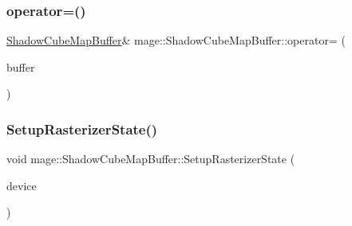 \hypertarget{structmage_1_1_shadow_cube_map_buffer_aebf8e9d2e0a2ec5bf13dc40b93f97fde}{}\label{structmage_1_1_shadow_cube_map_buffer_aebf8e9d2e0a2ec5bf13dc40b93f97fde} 
\subsubsection{\texorpdfstring{operator=()}{operator=()}\hspace{0.1cm}{\footnotesize\ttfamily [2/2]}}
{\footnotesize\ttfamily \hyperlink{structmage_1_1_shadow_cube_map_buffer}{Shadow\+Cube\+Map\+Buffer}\& mage\+::\+Shadow\+Cube\+Map\+Buffer\+::operator= (\begin{DoxyParamCaption}\item[{\hyperlink{structmage_1_1_shadow_cube_map_buffer}{Shadow\+Cube\+Map\+Buffer} \&\&}]{buffer }\end{DoxyParamCaption})\hspace{0.3cm}{\ttfamily [delete]}}

\hypertarget{structmage_1_1_shadow_cube_map_buffer_a2bee1ede60f16cc3b9cfc9ee72a8dec9}{}\label{structmage_1_1_shadow_cube_map_buffer_a2bee1ede60f16cc3b9cfc9ee72a8dec9} 
\subsubsection{\texorpdfstring{Setup\+Rasterizer\+State()}{SetupRasterizerState()}}
{\footnotesize\ttfamily void mage\+::\+Shadow\+Cube\+Map\+Buffer\+::\+Setup\+Rasterizer\+State (\begin{DoxyParamCaption}\item[{I\+D3\+D11\+Device5 $\ast$}]{device }\end{DoxyParamCaption})\hspace{0.3cm}{\ttfamily [private]}}

\hypertarget{structmage_1_1_shadow_cube_map_buffer_af2fcb67943e27ee60c71524993493109}{}\label{structmage_1_1_shadow_cube_map_buffer_af2fcb67943e27ee60c71524993493109} 
